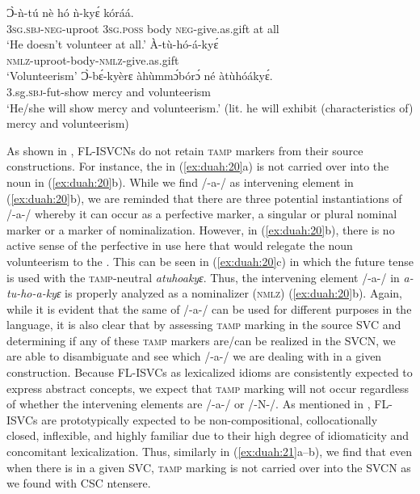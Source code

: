 \documentclass[output=paper,modfonts,nonflat,colorlinks, citecolor=brown, hidelinks]{langsci/langscibook}
\begin{document}
\ea\label{ex:duah:20}
\ea\label{ex:duah:20a}
\gll Ɔ̀-ǹ-tú nè hó ǹ-kyɛ́ kóráá.\\
3\textsc{sg}.\textsc{sbj}-\textsc{neg}-uproot 3\textsc{sg}.\textsc{poss} body \textsc{neg}-give.as.gift {at all}\\
\glt `He doesn’t volunteer at all.'
\ex\label{ex:duah:20b}
\gll À-tù-hó-á-kyɛ́\\
\textsc{nmlz}-uproot-body-\textsc{nmlz}-give.as.gift\\
\glt `Volunteerism'
\ex\label{ex:duah:20c}
\gll Ɔ̀-bɛ́-kyèrɛ àhùmmɔ́bórɔ́ né àtùhóákyɛ́.\\
3.sg.\textsc{sbj}-fut-show mercy and 	volunteerism\\
\glt `He/she will show mercy and volunteerism.' (lit. he will exhibit (characteristics of) mercy and volunteerism)
\z
\z

\newpage
As shown in , FL-ISVCNs do not   retain \textsc{tamp} markers from their source constructions. For instance, the  in (\ref{ex:duah:20}a) is not carried over into the noun in (\ref{ex:duah:20}b). While we find /-a-/ as intervening element in (\ref{ex:duah:20}b), we are reminded that there are three potential instantiations of /-a-/ whereby it can occur as a perfective marker, a singular or plural nominal marker or a marker of nominalization. However, in (\ref{ex:duah:20}b), there is no active sense of the perfective in use here that would relegate the noun volunteerism to the . This can be seen in (\ref{ex:duah:20}c) in which the future tense is used with the \textsc{tamp}-neutral \textit{atuhoakyɛ}. Thus, the intervening element /-a-/ in \textit{a-tu-ho-a-kyɛ} is properly analyzed as a nominalizer (\textsc{nmlz}) (\ref{ex:duah:20}b). Again, while it is evident that the same  of /-a-/ can be used for different purposes in the language, it is also clear that by assessing \textsc{tamp} marking in the source SVC and determining if any of these \textsc{tamp} markers are/can be realized in the SVCN, we are able to disambiguate and see which /-a-/ we are dealing with in a given construction. Because FL-ISVCs as lexicalized idioms are consistently expected to express abstract concepts, we expect that \textsc{tamp} marking will not occur regardless of whether the intervening elements are /-a-/ or /-N-/. As mentioned in , FL-ISVCs are prototypically expected to be non-compositional, collocationally closed, inflexible, and highly familiar due to their high degree of idiomaticity and concomitant lexicalization. Thus, similarly in (\ref{ex:duah:21}a--b), we find that even when there is  in a given SVC, \textsc{tamp} marking is not carried over into the SVCN as we found with CSC ntensere.
\end{document}
